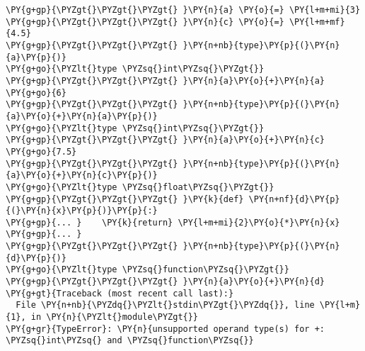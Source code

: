 \begin{Verbatim}[commandchars=\\\{\}]
\PY{g+gp}{\PYZgt{}\PYZgt{}\PYZgt{} }\PY{n}{a} \PY{o}{=} \PY{l+m+mi}{3}
\PY{g+gp}{\PYZgt{}\PYZgt{}\PYZgt{} }\PY{n}{c} \PY{o}{=} \PY{l+m+mf}{4.5}
\PY{g+gp}{\PYZgt{}\PYZgt{}\PYZgt{} }\PY{n+nb}{type}\PY{p}{(}\PY{n}{a}\PY{p}{)}
\PY{g+go}{\PYZlt{}type \PYZsq{}int\PYZsq{}\PYZgt{}}
\PY{g+gp}{\PYZgt{}\PYZgt{}\PYZgt{} }\PY{n}{a}\PY{o}{+}\PY{n}{a}
\PY{g+go}{6}
\PY{g+gp}{\PYZgt{}\PYZgt{}\PYZgt{} }\PY{n+nb}{type}\PY{p}{(}\PY{n}{a}\PY{o}{+}\PY{n}{a}\PY{p}{)}
\PY{g+go}{\PYZlt{}type \PYZsq{}int\PYZsq{}\PYZgt{}}
\PY{g+gp}{\PYZgt{}\PYZgt{}\PYZgt{} }\PY{n}{a}\PY{o}{+}\PY{n}{c}
\PY{g+go}{7.5}
\PY{g+gp}{\PYZgt{}\PYZgt{}\PYZgt{} }\PY{n+nb}{type}\PY{p}{(}\PY{n}{a}\PY{o}{+}\PY{n}{c}\PY{p}{)}
\PY{g+go}{\PYZlt{}type \PYZsq{}float\PYZsq{}\PYZgt{}}
\PY{g+gp}{\PYZgt{}\PYZgt{}\PYZgt{} }\PY{k}{def} \PY{n+nf}{d}\PY{p}{(}\PY{n}{x}\PY{p}{)}\PY{p}{:}
\PY{g+gp}{... }    \PY{k}{return} \PY{l+m+mi}{2}\PY{o}{*}\PY{n}{x}
\PY{g+gp}{... }
\PY{g+gp}{\PYZgt{}\PYZgt{}\PYZgt{} }\PY{n+nb}{type}\PY{p}{(}\PY{n}{d}\PY{p}{)}
\PY{g+go}{\PYZlt{}type \PYZsq{}function\PYZsq{}\PYZgt{}}
\PY{g+gp}{\PYZgt{}\PYZgt{}\PYZgt{} }\PY{n}{a}\PY{o}{+}\PY{n}{d}
\PY{g+gt}{Traceback (most recent call last):}
  File \PY{n+nb}{\PYZdq{}\PYZlt{}stdin\PYZgt{}\PYZdq{}}, line \PY{l+m}{1}, in \PY{n}{\PYZlt{}module\PYZgt{}}
\PY{g+gr}{TypeError}: \PY{n}{unsupported operand type(s) for +: \PYZsq{}int\PYZsq{} and \PYZsq{}function\PYZsq{}}
\end{Verbatim}
